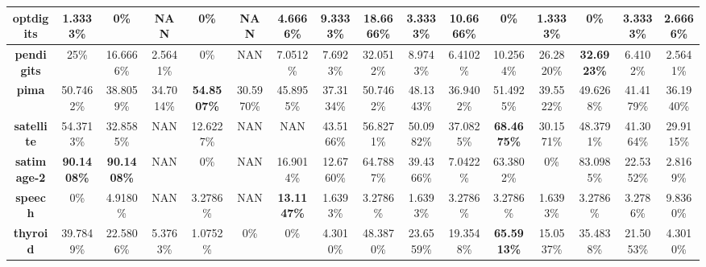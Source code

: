 \begin{table}[H]
{\begin{tabular}{|c|c|c|c|c|c|c|c|c|c|c|c|c|c|c|c|}
		\textbf{optdigits}        & 1.3333\%           & 0\%                & NAN             & 0\%                & NAN           & 4.6666\%           & 9.3333\%           & \textbf{18.6666\%} & 3.3333\%     & 10.6666\%          & 0\%                & 1.3333\%           & 0\%                & 3.3333\%           & 2.6666\%     \\ \hline
		\textbf{pendigits}        & 25\%               & 16.6666\%          & 2.5641\%        & 0\%                & NAN           & 7.0512\%           & 7.6923\%           & 32.0512\%          & 8.9743\%     & 6.4102\%           & 10.2564\%          & 26.2820\%          & \textbf{32.6923\%} & 6.4102\%           & 2.5641\%     \\ \hline
		\textbf{pima}             & 50.7462\%          & 38.8059\%          & 34.7014\%       & \textbf{54.8507\%} & 30.5970\%     & 45.8955\%          & 37.3134\%          & 50.7462\%          & 48.1343\%    & 36.9402\%          & 51.4925\%          & 39.5522\%          & 49.6268\%          & 41.4179\%          & 36.1940\%    \\ \hline
		\textbf{satellite}        & 54.3713\%          & 32.8585\%          & NAN             & 12.6227\%          & NAN           & NAN                & 43.5166\%          & 56.8271\%          & 50.0982\%    & 37.0825\%          & \textbf{68.4675\%} & 30.1571\%          & 48.3791\%          & 41.3064\%          & 29.9115\%    \\ \hline
		\textbf{satimage-2}       & \textbf{90.1408\%} & \textbf{90.1408\%} & NAN             & 0\%                & NAN           & 16.9014\%          & 12.6760\%          & 64.7887\%          & 39.4366\%    & 7.0422\%           & 63.3802\%          & 0\%                & 83.0985\%          & 22.5352\%          & 2.8169\%     \\ \hline
		\textbf{speech}           & 0\%                & 4.9180\%           & NAN             & 3.2786\%           & NAN           & \textbf{13.1147\%} & 1.6393\%           & 3.2786\%           & 1.6393\%     & 3.2786\%           & 3.2786\%           & 1.6393\%           & 3.2786\%           & 3.2786\%           & 9.8360\%     \\ \hline
		\textbf{thyroid}          & 39.7849\%          & 22.5806\%          & 5.3763\%        & 1.0752\%           & 0\%           & 0\%                & 4.3010\%           & 48.3870\%          & 23.6559\%    & 19.3548\%          & \textbf{65.5913\%} & 15.0537\%          & 35.4838\%          & 21.5053\%          & 4.3010\%     \\ \hline

\end{tabular}}
\end{table}
